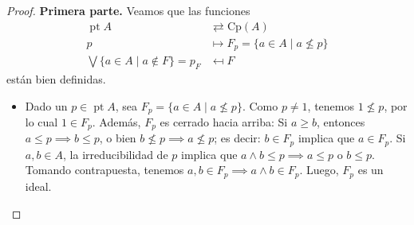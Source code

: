 \documentclass[12pt,letterpaper,titlepage]{article}
\theoremstyle{definition}
\newcommand\Sup{\bigvee}
\renewcommand\inf{\wedge}
\newcommand\<{\langle}
\renewcommand\>{\rangle}
\newcommand{\Cp}{\mathrm{Cp}}
\DeclareMathOperator{\pt}{pt}
\begin{document}
\begin{proof}
    \textbf{Primera parte.}
    Veamos que las funciones
    \begin{align*}
        \pt A &\rightleftarrows \Cp(A) \\
        p &\mapsto F_p = \{a\in A\mid a\nleq p\} \\
        \Sup\{a\in A\mid a\nin F\} = p_F &\mapsfrom F
    \end{align*}
    están bien definidas.
    \begin{itemize}
        \item
        Dado un $p\in\pt A$, sea $F_p=\{a\in A\mid a\nleq p\}$.
        Como $p\neq 1$, tenemos $1\nleq p$, por lo cual
        $1\in F_p$.
        Además, $F_p$ es cerrado hacia arriba:
        Si $a\geq b$, entonces $a\leq p\implies b\leq p$,
        o bien $b\nleq p\implies a\nleq p$;
        es decir: $b\in F_p$ implica que $a\in F_p$.
        Si $a,b\in A$, la irreducibilidad de $p$ implica que
        $a\inf b\leq p \implies a\leq p \text{ o } b\leq p$.
        Tomando contrapuesta, tenemos
        $a,b\in F_p \implies a\inf b\in F_p$.
        Luego, $F_p$ es un ideal.
        

\end{itemize}
\end{proof}
\end{document}
